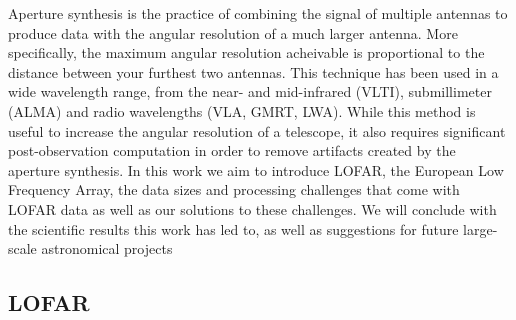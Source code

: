 Aperture synthesis is the practice of combining the signal of multiple antennas to produce data with the angular resolution of a much larger antenna. More specifically, the maximum angular resolution acheivable is proportional to the distance between your furthest two antennas. This technique has been used in a wide wavelength range, from the near- and mid-infrared (VLTI), submillimeter (ALMA) and radio wavelengths (VLA, GMRT, LWA). While this method is useful to increase the angular resolution of a telescope, it also requires significant post-observation computation in order to remove artifacts created by the aperture synthesis. In this work we aim to introduce LOFAR, the European Low Frequency Array, the data sizes and processing challenges that come with LOFAR data as well as our solutions to these challenges. We will conclude with the scientific results this work has led to, as well as suggestions for future large-scale astronomical projects

\subsection{LOFAR}
